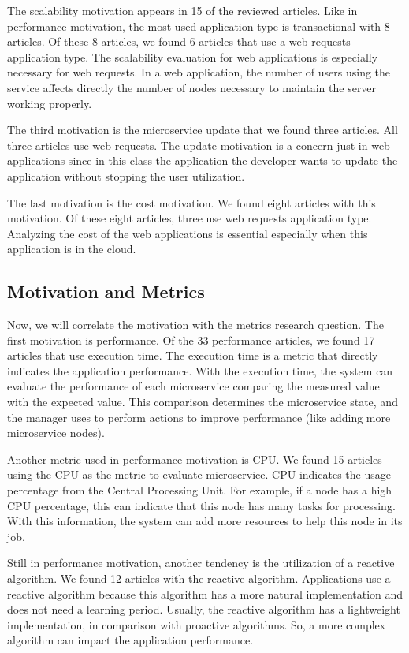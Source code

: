 The scalability motivation appears in 15 of the reviewed articles. Like in performance motivation, the most used application type is transactional with 8 articles. Of these 8 articles, we found 6 articles that use a web requests application type. The scalability evaluation for web applications is especially necessary for web requests. In a web application, the number of users using the service affects directly the number of nodes necessary to maintain the server working properly. 

The third motivation is the microservice update that we found three articles. All three articles use web requests. The update motivation is a concern just in web applications since in this class the application the developer wants to update the application without stopping the user utilization. 

The last motivation is the cost motivation. We found eight articles with this motivation. Of these eight articles, three use web requests application type. Analyzing the cost of the web applications is essential especially when this application is in the cloud. 

\subsection{Motivation and Metrics}
Now, we will correlate the motivation with the metrics research question. The first motivation is performance. Of the 33 performance articles, we found 17 articles that use execution time. The execution time is a metric that directly indicates the application performance. With the execution time, the system can evaluate the performance of each microservice comparing the measured value with the expected value. This comparison determines the microservice state, and the manager uses to perform actions to improve performance (like adding more microservice nodes). 

Another metric used in performance motivation is CPU. We found 15 articles using the CPU as the metric to evaluate microservice. CPU indicates the usage percentage from the Central Processing Unit. For example, if a node has a high CPU percentage, this can indicate that this node has many tasks for processing. With this information, the system can add more resources to help this node in its job. 

Still in performance motivation, another tendency is the utilization of a reactive algorithm. We found 12 articles with the reactive algorithm. Applications use a reactive algorithm because this algorithm has a more natural implementation and does not need a learning period. Usually, the reactive algorithm has a lightweight implementation, in comparison with proactive algorithms. So, a more complex algorithm can impact the application performance.

